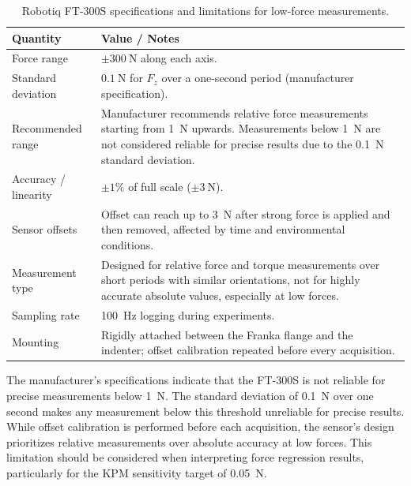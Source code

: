 \documentclass[11pt,a4paper]{article}
\begin{document}
\begin{table}[H]
    \centering
    \renewcommand{\arraystretch}{1.2}
    \caption{Robotiq FT-300S specifications and limitations for low-force measurements.}
    \begin{tabular}{@{}p{4.8cm}p{9.2cm}@{}}
        \toprule
        Quantity & Value / Notes \\
        \midrule
        Force range & \(\pm \SI{300}{\newton}\) along each axis. \\[0.4em]
        Standard deviation & \(\SI{0.1}{\newton}\) for \(F_z\) over a one-second period (manufacturer specification). \\[0.4em]
        Recommended range & Manufacturer recommends relative force measurements starting from \SI{1}{\newton} upwards. Measurements below \SI{1}{\newton} are not considered reliable for precise results due to the \SI{0.1}{\newton} standard deviation. \\[0.4em]
        Accuracy / linearity & \(\pm 1\%\) of full scale (\(\pm \SI{3}{\newton}\)). \\[0.4em]
        Sensor offsets & Offset can reach up to \SI{3}{\newton} after strong force is applied and then removed, affected by time and environmental conditions. \\[0.4em]
        Measurement type & Designed for relative force and torque measurements over short periods with similar orientations, not for highly accurate absolute values, especially at low forces. \\[0.4em]
        Sampling rate & \SI{100}{\hertz} logging during experiments. \\[0.4em]
        Mounting & Rigidly attached between the Franka flange and the indenter; offset calibration repeated before every acquisition. \\
        \bottomrule
    \end{tabular}
    \label{tab:ft-specs}
\end{table}

The manufacturer's specifications indicate that the FT-300S is not reliable for precise measurements below \SI{1}{\newton}. The standard deviation of \SI{0.1}{\newton} over one second makes any measurement below this threshold unreliable for precise results. While offset calibration is performed before each acquisition, the sensor's design prioritizes relative measurements over absolute accuracy at low forces. This limitation should be considered when interpreting force regression results, particularly for the KPM sensitivity target of \SI{0.05}{\newton}.
\end{document}
